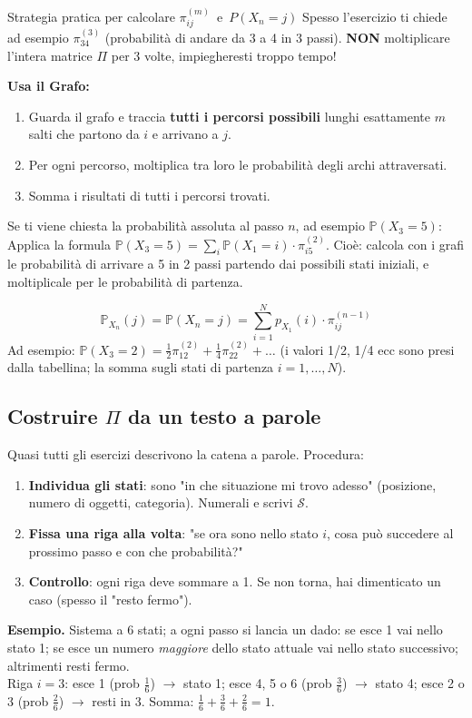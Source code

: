 \documentclass[12pt]{extarticle} %
\begin{document}
\begin{eserciziobox}{Strategia pratica per calcolare \mbox{$\pi_{ij}^{(m)}$ e $P(X_n=j)$}}
Spesso l'esercizio ti chiede ad esempio $\pi_{34}^{(3)}$ (probabilità di andare da 3 a 4 in 3 passi). \textbf{NON} moltiplicare l'intera matrice $\Pi$ per 3 volte, impiegheresti troppo tempo!

\textbf{Usa il Grafo:}
\begin{enumerate}
    \item Guarda il grafo e traccia \textbf{tutti i percorsi possibili} lunghi esattamente $m$ salti che partono da $i$ e arrivano a $j$.
    \item Per ogni percorso, moltiplica tra loro le probabilità degli archi attraversati.
    \item Somma i risultati di tutti i percorsi trovati.
\end{enumerate}

Se ti viene chiesta la probabilità assoluta al passo $n$, ad esempio $\mathbb{P}(X_3 = 5)$:
Applica la formula $\mathbb{P}(X_3 = 5) = \sum_i \mathbb{P}(X_1 = i) \cdot \pi_{i5}^{(2)}$. Cioè: calcola con i grafi le probabilità di arrivare a 5 in 2 passi partendo dai possibili stati iniziali, e moltiplicale per le probabilità di partenza.
\end{eserciziobox}

$$
\mathbb{P}_{X_n}(j) = \mathbb{P}(X_n = j) = \sum_{i=1}^{N} p_{X_1}(i) \cdot \pi_{ij}^{(n-1)}
$$
Ad esempio: $\mathbb{P}(X_3=2) = \frac{1}{2}\pi_{12}^{(2)} + \frac{1}{4}\pi_{22}^{(2)} + \ldots$ (i valori 1/2, 1/4 ecc sono presi dalla tabellina; la somma sugli stati di partenza $i = 1, \dots, N$).

\subsection{Costruire $\Pi$ da un testo a parole}
Quasi tutti gli esercizi descrivono la catena a parole. Procedura:
\begin{enumerate}
    \item \textbf{Individua gli stati}: sono "in che situazione mi trovo adesso" (posizione, numero di oggetti, categoria). Numerali e scrivi $\mathcal{S}$.
    \item \textbf{Fissa una riga alla volta}: "se ora sono nello stato $i$, cosa può succedere al prossimo passo e con che probabilità?"
    \item \textbf{Controllo}: ogni riga deve sommare a 1. Se non torna, hai dimenticato un caso (spesso il "resto fermo").
\end{enumerate}
{\footnotesize \textbf{Esempio.} Sistema a 6 stati; a ogni passo si lancia un dado: se esce 1 vai nello stato 1; se esce un numero \emph{maggiore} dello stato attuale vai nello stato successivo; altrimenti resti fermo. \\ Riga $i=3$: esce 1 (prob $\frac16$) $\to$ stato 1; esce 4, 5 o 6 (prob $\frac36$) $\to$ stato 4; esce 2 o 3 (prob $\frac26$) $\to$ resti in 3. Somma: $\frac16+\frac36+\frac26 = 1$. \checkmark}
\end{document}
